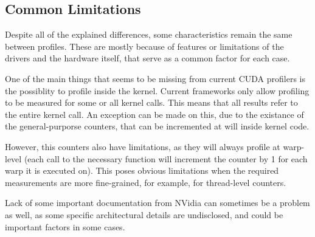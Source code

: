 \subsection{Common Limitations}
\label{sec:610}

Despite all of the explained differences, some characteristics remain the same between profiles. These are mostly because of features or limitations of the drivers and the hardware itself, that serve as a common factor for each case.

One of the main things that seems to be missing from current CUDA profilers is the possiblity to profile inside the kernel. Current frameworks only allow profiling to be measured for some or all kernel calls. This means that all results refer to the entire kernel call. An exception can be made on this, due to the existance of the general-purporse counters, that can be incremented at will inside kernel code.

However, this counters also have limitations, as they will always profile at warp-level (each call to the necessary function will increment the counter by 1 for each warp it is executed on). This poses obvious limitations when the required measurements are more fine-grained, for example, for thread-level counters.

Lack of some important documentation from NVidia can sometimes be a problem as well, as some specific architectural details are undisclosed, and could be important factors in some cases. 